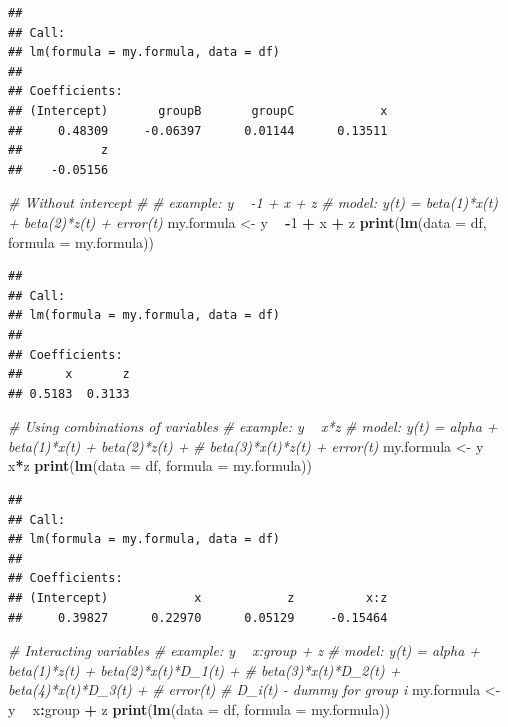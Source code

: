 \documentclass[11pt,]{book}
\newenvironment{Shaded}{\begin{snugshade}}{\end{snugshade}}
\newcommand{\KeywordTok}[1]{\textcolor[rgb]{0.27,0.27,0.27}{\textbf{#1}}}
\newcommand{\DataTypeTok}[1]{\textcolor[rgb]{0.27,0.27,0.27}{#1}}
\newcommand{\DecValTok}[1]{\textcolor[rgb]{0.06,0.06,0.06}{#1}}
\newcommand{\StringTok}[1]{\textcolor[rgb]{0.5,0.5,0.5}{#1}}
\newcommand{\CommentTok}[1]{\textcolor[rgb]{0.56,0.35,0.01}{\textit{#1}}}
\newcommand{\OperatorTok}[1]{\textcolor[rgb]{0.81,0.36,0.00}{\textbf{#1}}}
\newcommand{\NormalTok}[1]{#1}
\begin{document}
\begin{verbatim}
## 
## Call:
## lm(formula = my.formula, data = df)
## 
## Coefficients:
## (Intercept)       groupB       groupC            x  
##     0.48309     -0.06397      0.01144      0.13511  
##           z  
##    -0.05156
\end{verbatim}

\begin{Shaded}
\begin{Highlighting}[]
\CommentTok{# Without intercept}
\CommentTok{#}
\CommentTok{# example: y ~ -1 + x + z}
\CommentTok{# model: y(t) = beta(1)*x(t) + beta(2)*z(t) + error(t)}
\NormalTok{my.formula <-}\StringTok{ }\NormalTok{y }\OperatorTok{~}\StringTok{ }\OperatorTok{-}\DecValTok{1} \OperatorTok{+}\StringTok{ }\NormalTok{x }\OperatorTok{+}\StringTok{ }\NormalTok{z}
\KeywordTok{print}\NormalTok{(}\KeywordTok{lm}\NormalTok{(}\DataTypeTok{data =}\NormalTok{ df, }
         \DataTypeTok{formula =}\NormalTok{ my.formula))}
\end{Highlighting}
\end{Shaded}

\begin{verbatim}
## 
## Call:
## lm(formula = my.formula, data = df)
## 
## Coefficients:
##      x       z  
## 0.5183  0.3133
\end{verbatim}

\begin{Shaded}
\begin{Highlighting}[]
\CommentTok{# Using combinations of variables}
\CommentTok{# example: y ~ x*z}
\CommentTok{# model: y(t) = alpha + beta(1)*x(t) + beta(2)*z(t) + }
\CommentTok{#               beta(3)*x(t)*z(t) + error(t)}
\NormalTok{my.formula <-}\StringTok{ }\NormalTok{y }\OperatorTok{~}\StringTok{ }\NormalTok{x}\OperatorTok{*}\NormalTok{z}
\KeywordTok{print}\NormalTok{(}\KeywordTok{lm}\NormalTok{(}\DataTypeTok{data =}\NormalTok{ df, }
         \DataTypeTok{formula =}\NormalTok{ my.formula))}
\end{Highlighting}
\end{Shaded}

\begin{verbatim}
## 
## Call:
## lm(formula = my.formula, data = df)
## 
## Coefficients:
## (Intercept)            x            z          x:z  
##     0.39827      0.22970      0.05129     -0.15464
\end{verbatim}

\begin{Shaded}
\begin{Highlighting}[]
\CommentTok{# Interacting variables}
\CommentTok{# example: y ~ x:group + z}
\CommentTok{# model: y(t) = alpha + beta(1)*z(t) + beta(2)*x(t)*D_1(t) + }
\CommentTok{#               beta(3)*x(t)*D_2(t) + beta(4)*x(t)*D_3(t) + }
\CommentTok{#               error(t)}
\CommentTok{# D_i(t) - dummy for group i}
\NormalTok{my.formula <-}\StringTok{ }\NormalTok{y }\OperatorTok{~}\StringTok{ }\NormalTok{x}\OperatorTok{:}\NormalTok{group }\OperatorTok{+}\StringTok{ }\NormalTok{z}
\KeywordTok{print}\NormalTok{(}\KeywordTok{lm}\NormalTok{(}\DataTypeTok{data =}\NormalTok{ df, }
         \DataTypeTok{formula =}\NormalTok{ my.formula))}
\end{Highlighting}
\end{Shaded}
\end{document}
